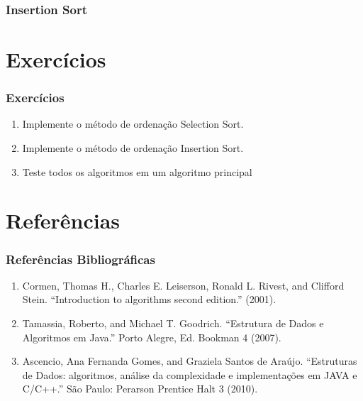 \documentclass{beamer}
\begin{document}
\begin{frame}
	\frametitle{Insertion Sort}
    \centering
    
\end{frame}

\section{Exercícios}

\begin{frame}
    \frametitle{Exercícios}
    \begin{enumerate}
        \item Implemente o método de ordenação Selection Sort.
        \item Implemente o método de ordenação Insertion Sort.
        \item Teste todos os algoritmos em um algoritmo principal
    \end{enumerate}
\end{frame}

\section{Referências}

\begin{frame}
    \frametitle{Referências Bibliográficas}
    \begin{enumerate}
        \item Cormen, Thomas H., Charles E. Leiserson, Ronald L. Rivest, and Clifford Stein. ``Introduction to algorithms second edition.'' (2001).
        \item Tamassia, Roberto, and Michael T. Goodrich. ``Estrutura de Dados e Algoritmos em Java.'' Porto Alegre, Ed. Bookman 4 (2007).
        \item Ascencio, Ana Fernanda Gomes, and Graziela Santos de Araújo. ``Estruturas de Dados: algoritmos, análise da complexidade e implementações em JAVA e C/C++.'' São Paulo: Perarson Prentice Halt 3 (2010).
    \end{enumerate}
\end{frame}
\end{document}
